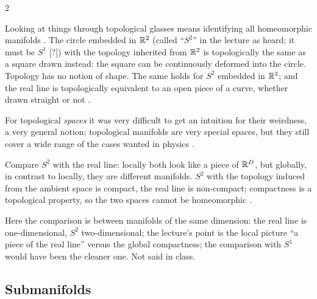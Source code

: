 \begin{paracol}{2}
\begin{example}\label{ex:mf-glasses}
Looking at things through topological glasses means identifying all homeomorphic manifolds . The circle embedded in $\mathbb{R}^2$ (called ``$S^2$'' in the lecture as heard; it must be $S^1$ [?]) with the topology inherited from $\mathbb{R}^2$ is topologically the same as a square drawn instead: the square can be continuously deformed into the circle. Topology has no notion of shape. The same holds for $S^2$ embedded in $\mathbb{R}^3$;
and the real line is topologically equivalent to an open piece of a curve, whether drawn straight or not .
\end{example}
For topological \emph{spaces} it was very difficult to get an intuition for their weirdness, a very general notion; topological manifolds are very special spaces, but they still cover a wide range of the cases wanted in physics .

\begin{intuition}\label{int:mf-local}
Compare $S^2$ with the real line: locally both look like a piece of $\mathbb{R}^D$, but globally, in contrast to locally, they are different manifolds. $S^2$ with the topology induced from the ambient space is compact, the real line is non-compact; compactness is a topological property, so the two
spaces cannot be homeomorphic .
\end{intuition}
\begin{coursenote}[Which $D$]
Here the comparison is between manifolds of the same dimension: the real line is one-dimensional, $S^2$ two-dimensional; the lecture's point is the local picture ``a piece of the real line'' versus the global compactness; the
comparison with $S^1$ would have been the cleaner one. Not said in class.
\end{coursenote}

\subsection{Submanifolds}


\end{paracol}
